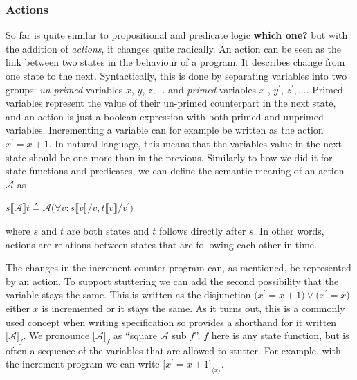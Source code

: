 \documentclass[english, biblatex, digitaloutput]{kththesis}
\begin{document}
\subsubsection{Actions}

So far  is quite similar to propositional and predicate logic \textbf{which one?} but with the addition of \textit{actions}, it changes quite radically. An action can be seen as the link between two states in the behaviour of a program. It describes change from one state to the next. Syntactically, this is done by separating variables into two groups: \textit{un-primed} variables $x$, $y$, $z, \dotsc$ and \textit{primed} variables $x^\prime$, $y^\prime$, $z^\prime, \dotsc$. Primed variables represent the value of their un-primed counterpart in the next state, and an action is just a boolean expression with both primed and unprimed variables. Incrementing a variable can for example be written as the action $x^\prime = x + 1$. In natural language, this means that the variables value in the next state should be one more than in the previous. Similarly to how we did it for state functions and predicates, we can define the semantic meaning of an action $\mathcal{A}$ as

\begin{math}
	s \llbracket \mathcal{A} \rrbracket t \triangleq \mathcal{A}\lparen \forall v : s\llbracket v \rrbracket / v, t\llbracket v \rrbracket / v^\prime \rparen
\end{math}

where $s$ and $t$ are both states and $t$ follows directly after $s$. In other words, actions are relations between states that are following each other in time.

The changes in the increment counter program can, as mentioned, be represented by an action. To support stuttering we can add the second possibility that the variable stays the same. This is written as the disjunction $\lparen x^\prime = x + 1 \rparen \lor \lparen x^\prime = x \rparen$ \ie either $x$ is incremented or it stays the same. As it turns out, this is a commonly used concept when writing specification so  provides a shorthand for it written $\lbrack \mathcal{A} \rbrack_f$. We pronounce $\lbrack \mathcal{A} \rbrack_f$ as ``square $\mathcal{A}$ sub $f$''. $f$ here is any state function, but is often a sequence of the variables that are allowed to stutter. For example, with the increment program we can write $\lbrack x^\prime = x + 1 \rbrack_{\langle x \rangle}$.
\end{document}
